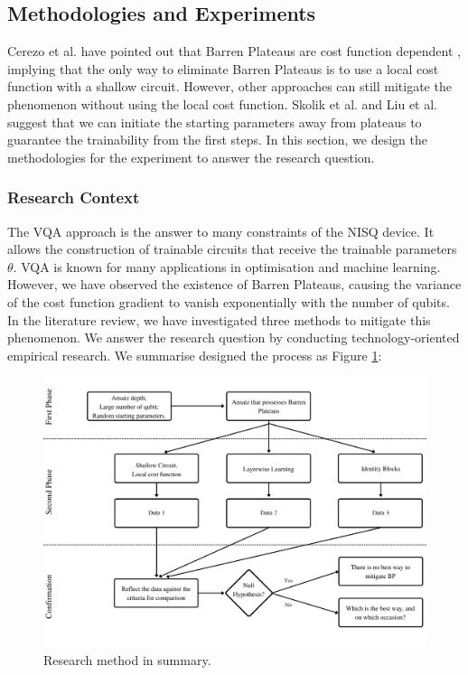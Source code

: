 \subsection{Methodologies and Experiments}
Cerezo et al. have pointed out that Barren Plateaus are cost function dependent \cite{cerezoCostFunctionDependent2021}, implying that the only way to eliminate Barren Plateaus is to use a local cost function with a shallow circuit.
However, other approaches can still mitigate the phenomenon without using the local cost function.
Skolik et al. and Liu et al. \cite{skolikLayerwiseLearningQuantum2021, liuParameterInitializationMethod2021} suggest that we can initiate the starting parameters away from plateaus to guarantee the trainability from the first steps.
In this section, we design the methodologies for the experiment to answer the research question.

\subsubsection{Research Context}
The VQA approach is the answer to many constraints of the NISQ device. It allows the construction of trainable circuits that receive the trainable parameters $\theta$.
VQA is known for many applications in optimisation and machine learning.
However, we have observed the existence of Barren Plateaus, causing the variance of the cost function gradient to vanish exponentially with the number of qubits.
In the literature review, we have investigated three methods \cite{cerezoCostFunctionDependent2021, liuParameterInitializationMethod2021, skolikLayerwiseLearningQuantum2021} to mitigate this phenomenon.
We answer the research question by conducting technology-oriented empirical research.
We summarise designed the process as Figure \ref{Research Activities}:

\begin{figure}
    \centering
    \includegraphics[width=\textwidth]{./ResearchDesign/Appendices/Method.png}
    \caption{
        Research method in summary.
    }
    \label{Research Activities}
\end{figure}

